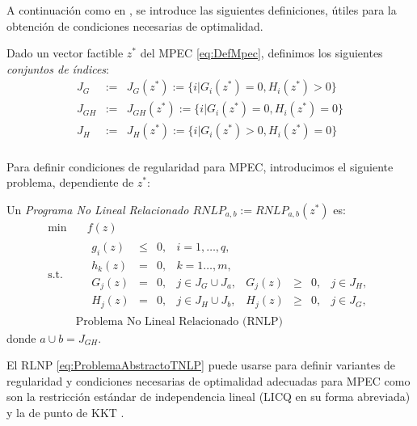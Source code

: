 A continuación como en \cite{Flegel2003AFJ}, se introduce las siguientes definiciones, \'utiles para la obtención de condiciones necesarias de optimalidad.
\begin{definition}
Dado un vector factible $z^*$ del MPEC \eqref{eq:DefMpec}, definimos los siguientes \textit{conjuntos de índices}:
\begin{equation}
\begin{aligned}
J_G&:=& J_G(z^*) := \{i|G_i(z^*) = 0, H_i(z^*) > 0\} \\
J_{GH}&:=& J_{GH}(z^*) := \{i|G_i(z^*) = 0, H_i(z^*) = 0\}  \\
J_H &:= &J_H(z^*) := \{i|G_i(z^*) > 0, H_i(z^*) = 0\}  \\
\end{aligned}
\label{eq:ConjuntoDeIndices} 
\end{equation}
\end{definition}

Para definir condiciones de regularidad para MPEC, introducimos el siguiente problema, dependiente de $z^*$:

\begin{definition}

Un \textit{Programa No Lineal Relacionado $RNLP_{a,b} := RNLP_{a,b}(z^*)$} es:
\begin{equation}
\begin{aligned}
\min  &\quad  f(z)  \\
\text{s.t.} &\quad \begin{matrix} g_i(z)& \leq& 0, &i=1,\ldots,q, \\ h_k(z) &=& 0,&k=1\ldots,m, \\
 G_j(z) &=& 0, & j\in J_G\cup J_{a},& G_j(z) &\geq& 0, & j\in J_H,\\ 
H_j(z) &=& 0, & j\in J_H\cup J_{b},& H_j(z) &\geq& 0, & j\in J_G,\end{matrix}\\
& \text{Problema No Lineal Relacionado (RNLP)}  
\end{aligned}
\label{eq:ProblemaAbstractoTNLP}
\end{equation}
    donde $a\cup b=J_{GH}$.
\end{definition}

El RLNP \eqref{eq:ProblemaAbstractoTNLP} puede  usarse para definir variantes de regularidad y condiciones necesarias de optimalidad  adecuadas para MPEC como son la  restricción estándar de independencia lineal (LICQ en su forma abreviada) y la de punto de KKT .


